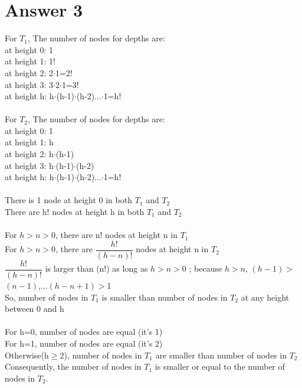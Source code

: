 \documentclass[12pt]{article}
\begin{document}
\section*{Answer 3}
 For $T_1$, The number of nodes for depths are: \\
 at height 0: 1 \\
 at height 1: 1! \\
 at height 2: 2$\cdot$1=2!  \\
 at height 3: 3$\cdot$2$\cdot$1=3! \\
 at height h: h$\cdot$(h-1)$\cdot$(h-2)...$\cdot$1=h! \\
 \\
 For $T_2$, The number of nodes for depths are: \\
 at height 0: 1 \\
 at height 1: h \\
 at height 2: h$\cdot$(h-1)  \\
 at height 3: h$\cdot$(h-1)$\cdot$(h-2) \\
 at height h: h$\cdot$(h-1)$\cdot$(h-2)...$\cdot$1=h! \\
 \\
 There is 1 node at height 0 in both $T_1$ and $T_2$ \\
 There are h! nodes at height h in both $T_1$ and $T_2$ \\
 \\
 For $h>n>0$, there are n! nodes at height n in $T_1$ \\
 For $h>n>0$, there are $\dfrac{h!}{(h-n)!}$ nodes at height n in $T_2$ \\
 $\dfrac{h!}{(h-n)!}$ is larger than (n!) as long as $h>n>0$ ; because $h>n$, $(h-1)$$>$$(n-1)$,...$(h-n+1)$$>$1 \\
 So, number of nodes in $T_1$ is smaller than number of nodes in $T_2$ at any height between 0 and h \\
 \\
 For h=0, number of nodes are equal (it's 1) \\
 For h=1, number of nodes are equal (it's 2) \\
 Otherwise(h$\geq$2), number of nodes in $T_1$ are smaller than number of nodes in $T_2$ \\
 Consequently, the number of nodes in $T_1$ is smaller or equal to the number of nodes in $T_2$. \\
 
\end{document}
